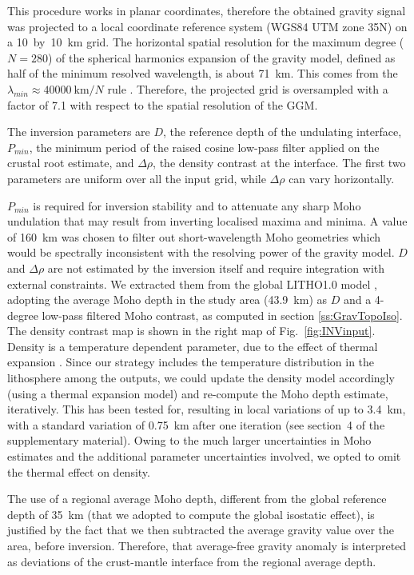 This procedure works in planar coordinates, therefore the obtained gravity signal was projected to a local coordinate reference system (WGS84 UTM zone 35N) on a 10~by~10~{km} grid.
The horizontal spatial resolution for the maximum degree ($N=280$) of the spherical harmonics expansion of the gravity model, defined as half of the minimum resolved wavelength, is about 71~km. This comes from the $\lambda_{min} \approx 40000~\textrm{km} / N $ rule \parencite{HofmannWellenhof2006}.
Therefore, the projected grid is oversampled with a factor of 7.1 with respect to the spatial resolution of the GGM.

The inversion parameters are $D$, the reference depth of the undulating interface, $P_{min}$, the minimum period of the raised cosine low-pass filter applied on the crustal root estimate, and $\Delta \rho$, the density contrast at the interface.
The first two parameters are uniform over all the input grid, while $\Delta \rho$ can vary horizontally.

$P_{min}$ is required for inversion stability and to attenuate any sharp Moho undulation that may result from inverting localised maxima and minima.
A value of 160~{km} was chosen to filter out short-wavelength Moho geometries which would be spectrally inconsistent with the resolving power of the gravity model.
$D$ and $\Delta \rho$ are not estimated by the inversion itself and require integration with external constraints.
We extracted them from the global {LITHO1.0} model \parencite{Pasyanos2014}, adopting the average Moho depth in the study area (43.9~km) as $D$ and a 4-degree low-pass filtered Moho contrast, as computed in section \ref{ss:GravTopoIso}.
The density contrast map is shown in the right map of Fig.~\ref{fig:INVinput}.
Density is a temperature dependent parameter, due to the effect of thermal expansion \parencite{allen2013basin}.
Since our strategy includes the temperature distribution in the lithosphere among the outputs, we could update the density model accordingly (using a thermal expansion model) and re-compute the Moho depth estimate, iteratively.
This has been tested for, resulting in local variations of up to \SI{3.4}{\kilo \metre}, with a standard variation of \SI{0.75}{\kilo \metre} after one iteration (see section~4 of the supplementary material).
Owing to the much larger uncertainties in Moho estimates \parencite[\textpm~5 to \textpm~15 percent, see ][]{Grad2009} and the additional parameter uncertainties involved, we opted to omit the thermal effect on density.

The use of a regional average Moho depth, different from the global reference depth of \SI{35}{\kilo \metre} (that we adopted to compute the global isostatic effect), is justified by the fact that we then subtracted the average gravity value over the area, before inversion.
Therefore, that average-free gravity anomaly is interpreted as deviations of the crust-mantle interface from the regional average depth.

